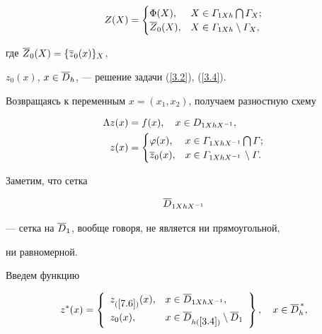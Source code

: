 $$


Z(X)=


\begin{cases}


\Phi(X), & X\in \G_{1Xh}\bigcap \G_X;\\


\ovl{Z}_0(X), & X\in \G_{1Xh}\setminus \G_X,


\end{cases}


$$


где $\overline{Z}_0(X)=\{\overline{z}_0(x)\}_X$, 


$z_0(x)$, $x\in\overline{D}_h$, --- решение задачи (\ref{3.2}), (\ref{3.4}).





Возвращаясь к переменным $x=(x_1,x_2)$, получаем разностную схему


\begin{equation}


\label{7.6}


\begin{split}


\La z(x)&=f(x), \quad x\in D_{1XhX^{-1}},\\


z(x)&=


\begin{cases}


\vf(x), & x\in \G_{1XhX^{-1}}\bigcap \G;\\


\ovl{z}_0(x), & x\in \G_{1XhX^{-1}\,}\setminus \G.


\end{cases}


\end{split}


\end{equation}


Заметим, что сетка


\begin{equation} \label{7.7}


\Db_{1XhX^{-1}}


\end{equation}


--- сетка на $\overline{D}_1$, вообще говоря, не является ни прямоугольной,


ни равномерной.





Введем функцию


\begin{equation} \label{7.8}


z^*(x)=\left\{


\begin{array}{ll}


z_{(\ref{7.6})}(x), & x\in \Db_{1XhX^{-1}},\\[2mm]


z_0(x), & x\in \Db_{h(\ref{3.4})}\setminus \Db_1


\end{array} \right\}, \quad x\in \Dbh^{\,*},


\end{equation}


